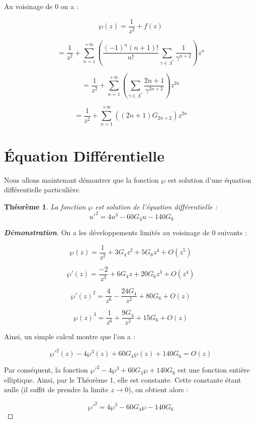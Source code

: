 \documentclass[12pt]{article}
\newtheorem{theorem}{Théorème}
\begin{document}
                Au voisinage de 0 on a :

                \[
                \wp(z) = \frac{1}{z^2} + f(z)
                \]

                \[
                = \frac{1}{z^2} + \sum_{n=1}^{+\infty} \left( \frac{(-1)^n (n+1)!}{n!} \sum_{\gamma \in \Lambda^*} \frac{1}{\gamma^{n+2}} \right) z^n
                \]

                \[
                = \frac{1}{z^2} + \sum_{n=1}^{+\infty} \left( \sum_{\gamma \in \Lambda^*} \frac{2n+1}{\gamma^{2n+2}} \right) z^{2n}
                \]

                \[
                = \frac{1}{z^2} + \sum_{n=1}^{+\infty} \left( (2n+1) G_{2n+2} \right) z^{2n}
                \]

                \section*{Équation Différentielle}

                Nous allons maintenant démontrer que la fonction \(\wp\) est solution d'une équation différentielle particulière.

                \begin{theorem}
                La fonction \(\wp\) est solution de l'équation différentielle :
                \[
                \ u'^2 = 4u^3 - 60G_4 u - 140G_6
                \]
                \end{theorem}

                \begin{proof}[\textbf{Démonstration}]
                On a les développements limités au voisinage de 0 suivants :

                \[
                \wp(z) = \frac{1}{z^2} + 3G_4z^2 + 5G_6z^4 + O(z^5)
                \]

                \[
                \wp'(z) = \frac{-2}{z^3} + 6G_4z + 20G_6z^3 + O(z^4)
                \]

                \[
                \wp'(z)^2 = \frac{4}{z^6} -  \frac{24G_4}{z^2} + 80G_6 + O(z)
                \]

                \[
                \wp(z)^3 = \frac{1}{z^6} + \frac{9G_4}{z^2}+ 15G_6 + O(z)
                \]

                Ainsi, un simple calcul montre que l'on a :

                \[
                \wp'^2(z) - 4\wp^3(z) + 60G_4\wp(z) + 140G_6 = O(z)
                \]

                Par conséquent, la fonction \(\wp'^2 - 4\wp^3 + 60G_4\wp + 140G_6\) est une fonction entière elliptique. Ainsi, par le Théorème 1, elle est constante. Cette constante étant nulle (il suffit de prendre la limite \(z \to 0\)), on obtient alors :

                \[
                \wp'^2 = 4\wp^3 - 60G_4\wp - 140G_6
                \]
                \end{proof}
\end{document}
